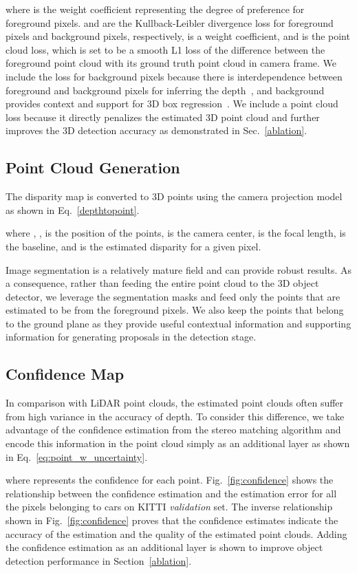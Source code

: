 \documentclass[letterpaper, 10 pt, conference]{ieeeconf}
\begin{document}
where  is the weight coefficient representing the degree of preference for foreground pixels.  and  are the Kullback-Leibler divergence loss for foreground pixels and background pixels, respectively,  is a weight coefficient, and  is the point cloud loss, which is set to be a smooth L1 loss of the difference between the foreground point cloud  with its ground truth point cloud  in camera frame. We include the loss for background pixels because there is interdependence between foreground and background pixels for inferring the depth~\cite{wang2019task}, and background provides context and support for 3D box regression~\cite{shi2019pointrcnn}. We include a point cloud loss because it directly penalizes the estimated 3D point cloud and further improves the 3D detection accuracy as demonstrated in Sec.~\ref{ablation}.

\subsection{Point Cloud Generation}
The disparity map is converted to 3D points using the camera projection model as shown in Eq.~\ref{depthtopoint}.

where , ,  is the position of the points,  is the camera center,  is the focal length,  is the baseline, and  is the estimated disparity for a given pixel.

Image segmentation is a relatively mature field and can provide robust results. As a consequence, rather than feeding the entire point cloud to the 3D object detector, we leverage the segmentation masks and feed only the points that are estimated to be from the foreground pixels. We also keep the points that belong to the ground plane as they provide useful contextual information and supporting information for generating proposals in the detection stage.  

\subsection{Confidence Map}
In comparison with LiDAR point clouds, the estimated point clouds often suffer from high variance in the accuracy of depth. To consider this difference, we take advantage of the confidence estimation from the stereo matching algorithm and encode this information in the point cloud simply as an additional layer as shown in Eq.~\ref{eq:point_w_uncertainty}.

where  represents the confidence for each point.
Fig.~\ref{fig:confidence} shows the relationship between the confidence estimation and the estimation error for all the pixels belonging to cars on KITTI \emph{validation} set. The inverse relationship shown in Fig.~\ref{fig:confidence} proves that the confidence estimates indicate the accuracy of the estimation and the quality of the estimated point clouds. Adding the confidence estimation as an additional layer is shown to improve object detection performance in Section~\ref{ablation}.
\end{document}

